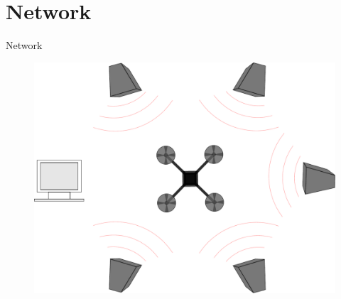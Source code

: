 \section{Network}
\begin{frame}{Network}{}
   \begin{figure}
       \centering
        \includegraphics[width=0.5\linewidth]{figures/system.pdf}
    \end{figure} 

    
\end{frame}

